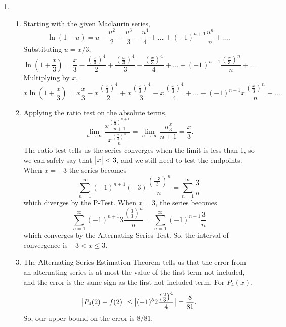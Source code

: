 \begin{enumerate}
	\item \begin{enumerate}
		\item Starting with the given Maclaurin series,
			\begin{equation*}
				\ln{(1+u)} = u - \frac{u^2}{2} + \frac{u^3}{3} - \frac{u^4}{4} + \ldots + (-1)^{n+1}\frac{u^n}{n} + \ldots .
			\end{equation*}
			Substituting $u=x/3$,
			\begin{equation*}
				\ln{\left(1+\frac{x}{3}\right)} = \frac{x}{3} - \frac{(\frac{x}{3})^4}{2} + \frac{(\frac{x}{3})^4}{3} - \frac{(\frac{x}{3})^4}{4} + \ldots + (-1)^{n+1}\frac{(\frac{x}{3})^n}{n} + \ldots .
			\end{equation*}
			Multiplying by $x$,
			\begin{equation*}
				x\ln{\left(1+\frac{x}{3}\right)} = x\frac{x}{3} - x\frac{(\frac{x}{3})^4}{2} + x\frac{(\frac{x}{3})^4}{3} - x\frac{(\frac{x}{3})^4}{4} + \ldots + (-1)^{n+1}x\frac{(\frac{x}{3})^n}{n} + \ldots .
			\end{equation*}
		\item Applying the ratio test on the absolute terms,
			\begin{equation*}
				\lim_{n\to\infty}{\frac{x\frac{(\frac{x}{3})^{n+1}}{n+1}}{x\frac{(\frac{x}{3})^n}{n}}} = \lim_{n\to\infty}{\frac{n\frac{x}{3}}{n+1}} = \frac{x}{3}.
			\end{equation*}
			The ratio test tells us the series converges when the limit is less than 1, so we can safely say that $\big\lvert x \big\rvert < 3$, and we still need to test the endpoints.
			When $x=-3$ the series becomes
			\begin{equation*}
				\sum_{n=1}^{\infty}{(-1)^{n+1}(-3)\frac{\left(\frac{-3}{3}\right)^n}{n}} = \sum_{n=1}^{\infty}{\frac{3}{n}}
			\end{equation*}
			which diverges by the P-Test.
			When $x=3$, the series becomes
			\begin{equation*}
				\sum_{n=1}^{\infty}{(-1)^{n+1}3\frac{\left(\frac{3}{3}\right)^{n}}{n}} = \sum_{n=1}^{\infty}{(-1)^{n+1}\frac{3}{n}}
			\end{equation*}
			which converges by the Alternating Series Test.
			So, the interval of convergence is $-3 < x \leq 3$.
		\item The Alternating Series Estimation Theorem tells us that the error from an alternating series is at most the value of the first term not included, and the error is the same sign as the first not included term.
			For $P_4(x)$,
			\begin{equation*}
				\big\lvert P_4(2)-f(2) \big\rvert \leq \big\lvert (-1)^5 2\frac{\left(\frac{2}{3}\right)^4}{4} \big\rvert = \frac{8}{81}.
			\end{equation*}
			So, our upper bound on the error is $8/81$.
	\end{enumerate}
	
\end{enumerate}